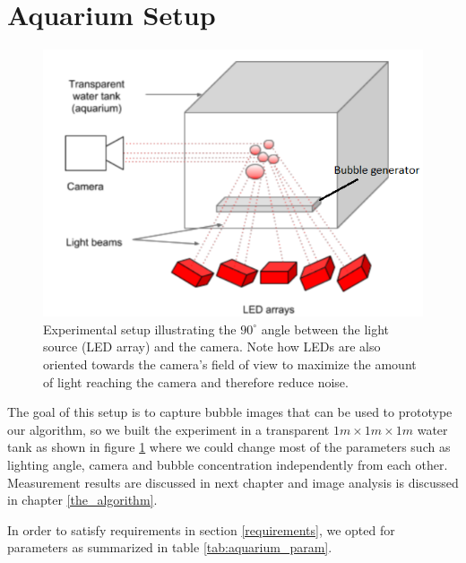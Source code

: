 	\section{Aquarium Setup}
		\begin{figure}
			\centering
			\includegraphics[scale=1]{images/aquarium_setup}
			\caption{Experimental setup illustrating the $90^\circ$ angle between the light source (LED array) and the camera. Note how LEDs are also oriented towards the camera's field of view to maximize the amount of light reaching the camera and therefore reduce noise.}
			\label{fig:aquarium_setup}
		\end{figure}			
		
		The goal of this setup is to capture bubble images that can be used to prototype our algorithm, so we built the experiment in a transparent $1m \times 1m \times 1m$ water tank as shown in figure \ref{fig:aquarium_setup} where we could change most of the parameters such as lighting angle, camera and bubble concentration independently from each other. Measurement results are discussed in next chapter and image analysis is discussed in chapter \ref{the_algorithm}.
		
		In order to satisfy requirements in section \ref{requirements}, we opted for parameters as summarized in table \ref{tab:aquarium_param}. 
		
